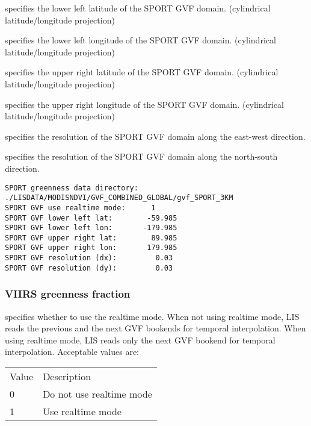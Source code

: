   specifies the lower left latitude
 of the SPORT GVF domain.
 (cylindrical latitude/longitude projection)

  specifies the lower left
 longitude of the SPORT GVF domain.
 (cylindrical latitude/longitude projection)

  specifies the upper right latitude
 of the SPORT GVF domain.
 (cylindrical latitude/longitude projection)

  specifies the upper right
 longitude of the SPORT GVF domain.
 (cylindrical latitude/longitude projection)

  specifies the resolution of the 
 SPORT GVF domain along the east-west direction.

  specifies the resolution of the 
 SPORT GVF domain along the north-south direction.
 

 \begin{Verbatim}[frame=single]
SPORT greenness data directory:  ./LISDATA/MODISNDVI/GVF_COMBINED_GLOBAL/gvf_SPORT_3KM
SPORT GVF use realtime mode:      1
SPORT GVF lower left lat:        -59.985
SPORT GVF lower left lon:       -179.985
SPORT GVF upper right lat:        89.985
SPORT GVF upper right lon:       179.985
SPORT GVF resolution (dx):         0.03
SPORT GVF resolution (dy):         0.03
 \end{Verbatim}

 
 \subsubsection{VIIRS greenness fraction}
 \label{sssec:viirsgreenness}
 

 
  specifies whether to use the
 realtime mode.  When not using realtime mode, LIS reads the
 previous and the next GVF bookends for temporal interpolation.
 When using realtime mode, LIS reads only the next GVF bookend
 for temporal interpolation.
 Acceptable values are:

 \begin{tabular}{ll}
 Value & Description              \\
 0     & Do not use realtime mode \\
 1     & Use realtime mode        \\
 \end{tabular}

